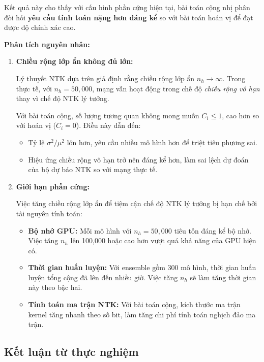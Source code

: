Kết quả này cho thấy với cấu hình phần cứng hiện tại, bài toán cộng nhị phân đòi hỏi \textbf{yêu cầu tính toán nặng hơn đáng kể} so với bài toán hoán vị để đạt được độ chính xác cao.

\textbf{Phân tích nguyên nhân:}

\begin{enumerate}
    \item \textbf{Chiều rộng lớp ẩn không đủ lớn:}
    
    Lý thuyết NTK dựa trên giả định rằng chiều rộng lớp ẩn $n_h \rightarrow \infty$. Trong thực tế, với $n_h = 50,000$, mạng vẫn hoạt động trong chế độ \textit{chiều rộng vô hạn} thay vì chế độ NTK lý tưởng.
    
    Với bài toán cộng, số lượng tương quan không mong muốn $C_i \leq 1$, cao hơn so với hoán vị ($C_i = 0$). Điều này dẫn đến:
    \begin{itemize}
        \item Tỷ lệ $\sigma^2/\mu^2$ lớn hơn, yêu cầu nhiều mô hình hơn để triệt tiêu phương sai.
        \item Hiệu ứng chiều rộng vô hạn trở nên đáng kể hơn, làm sai lệch dự đoán của bộ dự báo NTK so với mạng thực tế.
    \end{itemize}
    
    \item \textbf{Giới hạn phần cứng:}
    
    Việc tăng chiều rộng lớp ẩn để tiệm cận chế độ NTK lý tưởng bị hạn chế bởi tài nguyên tính toán:
    \begin{itemize}
        \item \textbf{Bộ nhớ GPU:} Mỗi mô hình với $n_h = 50,000$ tiêu tốn đáng kể bộ nhớ. Việc tăng $n_h$ lên 100,000 hoặc cao hơn vượt quá khả năng của GPU hiện có.
        \item \textbf{Thời gian huấn luyện:} Với ensemble gồm 300 mô hình, thời gian huấn luyện tổng cộng đã lên đến nhiều giờ. Việc tăng $n_h$ sẽ làm tăng thời gian này theo bậc hai.
        \item \textbf{Tính toán ma trận NTK:} Với bài toán cộng, kích thước ma trận kernel tăng nhanh theo số bit, làm tăng chi phí tính toán nghịch đảo ma trận.
    \end{itemize}
\end{enumerate}

\subsection{Kết luận từ thực nghiệm}

